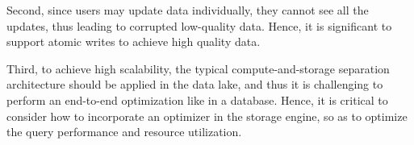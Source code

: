 Second, since users may update data individually,  they cannot see all the updates, thus leading to corrupted low-quality data. Hence, it is significant to support atomic writes to achieve high quality data. 


Third, to achieve high scalability, the typical compute-and-storage separation architecture should be applied in the data lake, and thus it is challenging to perform an end-to-end optimization like in a database. Hence, it is critical to consider how to incorporate an optimizer in the storage engine, so as to optimize the query performance and resource utilization.
%













